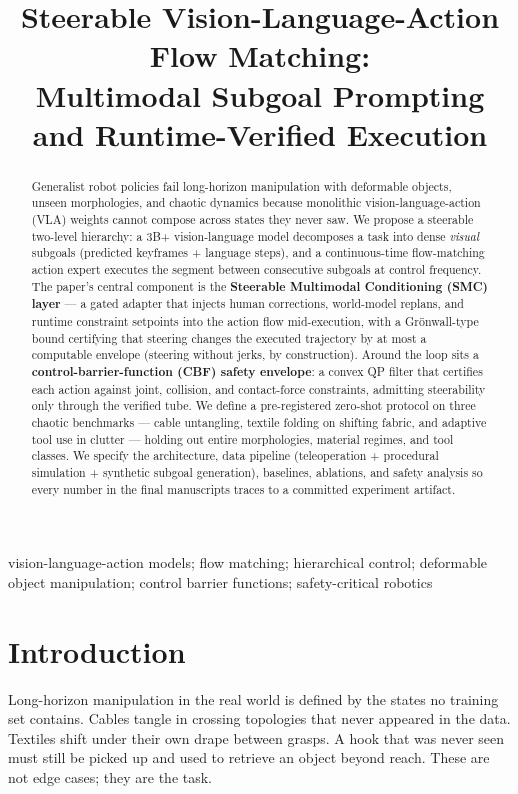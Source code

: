 \documentclass[conference,10pt]{IEEEtran}
\title{Steerable Vision-Language-Action Flow Matching:\\Multimodal Subgoal Prompting and Runtime-Verified Execution}
\author{\IEEEauthorblockN{Sehaj Singh}
\IEEEauthorblockA{\textit{Independent Research}\\\\
2026, \url{sehaj@example.com}}}
\begin{document}
\maketitle

\begin{abstract}
Generalist robot policies fail long-horizon manipulation with deformable objects, unseen morphologies, and chaotic dynamics because monolithic vision-language-action (VLA) weights cannot compose across states they never saw. We propose a steerable two-level hierarchy: a 3B+ vision-language model decomposes a task into dense \emph{visual} subgoals (predicted keyframes + language steps), and a continuous-time flow-matching action expert executes the segment between consecutive subgoals at control frequency. The paper's central component is the \textbf{Steerable Multimodal Conditioning (SMC) layer} --- a gated adapter that injects human corrections, world-model replans, and runtime constraint setpoints into the action flow mid-execution, with a Gr\"onwall-type bound certifying that steering changes the executed trajectory by at most a computable envelope (steering without jerks, by construction). Around the loop sits a \textbf{control-barrier-function (CBF) safety envelope}: a convex QP filter that certifies each action against joint, collision, and contact-force constraints, admitting steerability only through the verified tube. We define a pre-registered zero-shot protocol on three chaotic benchmarks --- cable untangling, textile folding on shifting fabric, and adaptive tool use in clutter --- holding out entire morphologies, material regimes, and tool classes. We specify the architecture, data pipeline (teleoperation + procedural simulation + synthetic subgoal generation), baselines, ablations, and safety analysis so every number in the final manuscripts traces to a committed experiment artifact.
\end{abstract}

\begin{IEEEkeywords}
vision-language-action models; flow matching; hierarchical control; deformable object manipulation; control barrier functions; safety-critical robotics
\end{IEEEkeywords}

\section{Introduction}
Long-horizon manipulation in the real world is defined by the states no training set contains. Cables tangle in crossing topologies that never appeared in the data. Textiles shift under their own drape between grasps. A hook that was never seen must still be picked up and used to retrieve an object beyond reach. These are not edge cases; they are the task.
\end{document}

